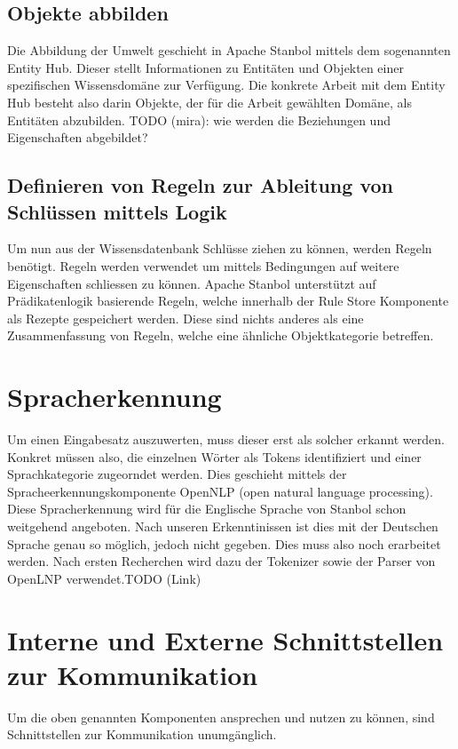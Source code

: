 \subsection{Objekte abbilden}
\label{sec:architektur_wissensdatenbank_Objekte}
Die Abbildung der Umwelt geschieht in Apache Stanbol mittels dem sogenannten Entity Hub.
Dieser stellt Informationen zu Entitäten und Objekten einer spezifischen Wissensdomäne zur Verfügung. Die konkrete Arbeit mit dem Entity Hub besteht also darin Objekte, der für die Arbeit gewählten Domäne, als Entitäten abzubilden.
TODO (mira): wie werden die Beziehungen und Eigenschaften abgebildet? 
\subsection{Definieren von Regeln zur Ableitung von Schlüssen mittels Logik}
\label{sec:architektur_regeln}
Um nun aus der Wissensdatenbank Schlüsse ziehen zu können, werden Regeln benötigt. Regeln werden verwendet um mittels Bedingungen auf weitere Eigenschaften schliessen zu können.
Apache Stanbol unterstützt auf Prädikatenlogik basierende Regeln, welche innerhalb der Rule Store Komponente als Rezepte gespeichert werden. Diese sind nichts anderes als eine Zusammenfassung von Regeln, welche eine ähnliche Objektkategorie betreffen.

\section{Spracherkennung}
\label{sec:architektur_spracherkennung}
Um einen Eingabesatz auszuwerten, muss dieser erst als solcher erkannt werden. Konkret müssen also, die einzelnen Wörter als Tokens identifiziert und einer Sprachkategorie zugeorndet werden. Dies geschieht mittels der Spracheerkennungskomponente OpenNLP (open natural language processing). Diese Spracherkennung wird für die Englische Sprache von Stanbol schon weitgehend angeboten. Nach unseren Erkenntinissen ist dies mit der Deutschen Sprache genau so möglich, jedoch nicht gegeben. Dies muss also noch erarbeitet werden. Nach ersten Recherchen wird dazu der Tokenizer sowie der Parser von OpenLNP verwendet.TODO (Link)

\section{Interne und Externe Schnittstellen zur Kommunikation}
\label{sec:architektur_schnittstellen}
Um die oben genannten Komponenten ansprechen und nutzen zu können, sind Schnittstellen zur Kommunikation unumgänglich.

